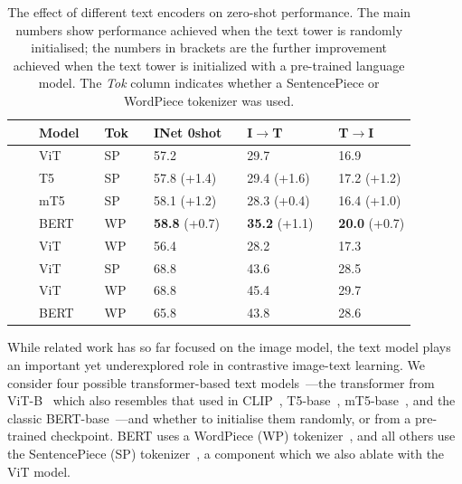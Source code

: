 \documentclass[10pt,twocolumn,letterpaper]{article}
\begin{document}
\begin{table}[t]
  \setlength{\tabcolsep}{0pt}
  \setlength{\extrarowheight}{5pt}
  \renewcommand{\arraystretch}{0.75}
  \centering
  \begin{tabularx}{\linewidth}{p{0.4cm}p{0.1cm}p{1.2cm}p{0.1cm}p{0.5cm}p{0.1cm}Cp{0.1cm}Cp{0.1cm}C}
    \toprule[1pt]
     && \textbf{Model} && \textbf{Tok} && \textbf{INet 0shot} && \textbf{I$\rightarrow$T} && \textbf{T$\rightarrow$I} \\
    \midrule
     && ViT  && SP && 57.2 \phantom{(+0.0)} && 29.7 \phantom{(+0.0)} && 16.9 \phantom{(+0.0)} \\
     && T5   && SP && 57.8 (+1.4)           && 29.4 (+1.6)           && 17.2 (+1.2) \\
     && mT5  && SP && 58.1 (+1.2)           && 28.3 (+0.4)           && 16.4 (+1.0) \\
     && BERT && WP && \textbf{58.8} (+0.7)  && \textbf{35.2} (+1.1)  && \textbf{20.0} (+0.7) \\
     && ViT  && WP && 56.4 \phantom{(+0.0)} && 28.2 \phantom{(+0.0)} && 17.3 \phantom{(+0.0)} \\
    \midrule[0.25pt]
      && ViT  && SP && 68.8 \phantom{(+0.0)} && 43.6 \phantom{(+0.0)} && 28.5 \phantom{(+0.0)} \\
     && ViT  && WP && 68.8 \phantom{(+0.0)} && 45.4 \phantom{(+0.0)} && 29.7 \phantom{(+0.0)} \\
     && BERT && WP && 65.8 \phantom{(+0.0)} && 43.8 \phantom{(+0.0)} && 28.6 \phantom{(+0.0)} \\
    \bottomrule[1pt]
  \end{tabularx}
\caption{The effect of different text encoders on zero-shot performance. The  main  numbers  show  performance  achieved  when the text tower is randomly initialised; the numbers in brackets are the further improvement achieved when the text tower is initialized with a pre-trained language model.
The \emph{Tok} column indicates whether a SentencePiece or WordPiece tokenizer was used.}\label{tab:text_encoder}
\end{table}

While related work has so far focused on the image model, the text model plays an important yet 
underexplored role in contrastive image-text learning. We consider four possible transformer-based text models~\cite{transformer}---the transformer from ViT-B~\cite{vit} which also resembles that used in CLIP~\cite{clip}, T5-base~\cite{T5}, mT5-base~\cite{mt5}, and the classic BERT-base~\cite{bert}---and whether to initialise them randomly, or from a pre-trained checkpoint. BERT uses a WordPiece (WP) tokenizer~\cite{translate,japkorvoice}, and all others use the SentencePiece (SP) tokenizer~\cite{sentencepiece}, a component which we also ablate with the ViT model.
\end{document}
